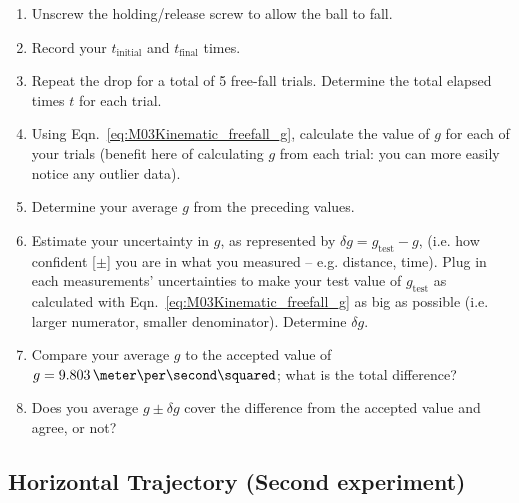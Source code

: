 \begin{enumerate}
\item Unscrew the holding/release screw to allow the ball to fall.
\item Record your $t_{\text{initial}}$ and $t_{\text{final}}$ times.
\item Repeat the drop for a total of 5 free-fall trials. Determine the total elapsed times $t$ for each trial.
\item Using Eqn.~\ref{eq:M03Kinematic_freefall_g}, calculate the value of $g$ for each of your trials (benefit here of calculating $g$ from each trial: you can more easily notice any outlier data).
\item Determine your average $g$ from the preceding values.
\item Estimate your uncertainty in $g$, as represented by $\delta g = g_\text{test} - g$, (i.e. how confident [$\pm$] you are in what you measured -- e.g. distance, time). Plug in each measurements' uncertainties to make your test value of $g_\text{test}$ as calculated with Eqn.~\ref{eq:M03Kinematic_freefall_g} as big as possible (i.e. larger numerator, smaller denominator). Determine $\delta g$.
\item Compare your average $g$ to the accepted value of $g = 9.803\,\meter\per\second\squared$; what is the total difference?
\item Does you average $g \pm \delta g$ cover the difference from the accepted value and agree, or not?

\end{enumerate}


\subsection{Horizontal Trajectory (Second experiment)}



